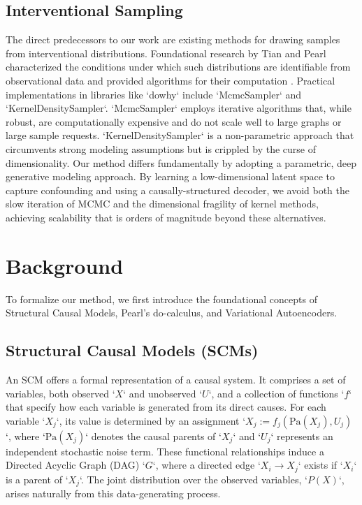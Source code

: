 \documentclass{article} %
\begin{document}
\subsection{Interventional Sampling}
The direct predecessors to our work are existing methods for drawing samples from interventional distributions. Foundational research by Tian and Pearl characterized the conditions under which such distributions are identifiable from observational data and provided algorithms for their computation \cite{bhattacharyya_2020_learning}. Practical implementations in libraries like `dowhy` include `McmcSampler` and `KernelDensitySampler`. `McmcSampler` employs iterative algorithms that, while robust, are computationally expensive and do not scale well to large graphs or large sample requests. `KernelDensitySampler` is a non-parametric approach that circumvents strong modeling assumptions but is crippled by the curse of dimensionality. Our method differs fundamentally by adopting a parametric, deep generative modeling approach. By learning a low-dimensional latent space to capture confounding \cite{huang_2022_latent} and using a causally-structured decoder, we avoid both the slow iteration of MCMC and the dimensional fragility of kernel methods, achieving scalability that is orders of magnitude beyond these alternatives.

\section{Background}
\label{sec:background}
To formalize our method, we first introduce the foundational concepts of Structural Causal Models, Pearl's do-calculus, and Variational Autoencoders.

\subsection{Structural Causal Models (SCMs)}
An SCM offers a formal representation of a causal system. It comprises a set of variables, both observed `$X$` and unobserved `$U$`, and a collection of functions `$f$` that specify how each variable is generated from its direct causes. For each variable `$X_j$`, its value is determined by an assignment `$X_j := f_j(\mathrm{Pa}(X_j), U_j)$`, where `$\mathrm{Pa}(X_j)$` denotes the causal parents of `$X_j$` and `$U_j$` represents an independent stochastic noise term. These functional relationships induce a Directed Acyclic Graph (DAG) `$G$`, where a directed edge `$X_i \rightarrow X_j$` exists if `$X_i$` is a parent of `$X_j$`. The joint distribution over the observed variables, `$P(X)$`, arises naturally from this data-generating process.
\end{document}
